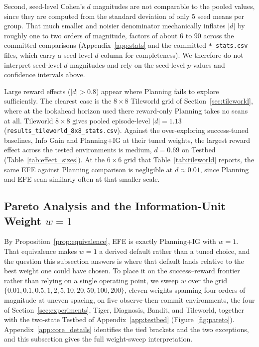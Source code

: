 Second, seed-level Cohen's $d$ magnitudes are not comparable to the pooled values, since they are computed from the standard deviation of only 5 seed means per group. That much smaller and noisier denominator mechanically inflates $|d|$ by roughly one to two orders of magnitude, factors of about $6$ to $90$ across the committed comparisons (Appendix~\ref{app:stats} and the committed \texttt{*\_\allowbreak stats.csv} files, which carry a seed-level $d$ column for completeness). We therefore do not interpret seed-level $d$ magnitudes and rely on the seed-level $p$-values and confidence intervals above.

Large reward effects ($|d| > 0.8$) appear where Planning fails to explore sufficiently. The clearest case is the $8{\times}8$ Tileworld grid of Section~\ref{sec:tileworld}, where at the lookahead horizon used there reward-only Planning takes no scans at all. Tileworld $8{\times}8$ gives pooled episode-level $|d| = 1.13$ (\texttt{results\_\allowbreak tileworld\_\allowbreak 8x8\_\allowbreak stats.csv}). Against the over-exploring success-tuned baselines, Info Gain and Planning+IG at their tuned weights, the largest reward effect across the tested environments is medium, $d{=}0.69$ on Testbed (Table~\ref{tab:effect_sizes}). At the $6{\times}6$ grid that Table~\ref{tab:tileworld} reports, the same EFE against Planning comparison is negligible at $d \approx 0.01$, since Planning and EFE scan similarly often at that smaller scale.

\subsection{Pareto Analysis and the Information-Unit Weight $w{=}1$}
\label{app:pareto_details}

By Proposition~\ref{prop:equivalence}, EFE is exactly Planning+IG with $w{=}1$. That equivalence makes $w{=}1$ a derived default rather than a tuned choice, and the question this subsection answers is where that default lands relative to the best weight one could have chosen. To place it on the success--reward frontier rather than relying on a single operating point, we sweep $w$ over the grid $\{0.01, 0.1, 0.5, 1, 2, 5, 10, 20, 50, 100, 200\}$, eleven weights spanning four orders of magnitude at uneven spacing, on five observe-then-commit environments, the four of Section~\ref{sec:experiments}, Tiger, Diagnosis, Bandit, and Tileworld, together with the two-state Testbed of Appendix~\ref{app:testbed} (Figure~\ref{fig:pareto}). Appendix~\ref{app:core_details} identifies the tied brackets and the two exceptions, and this subsection gives the full weight-sweep interpretation.

